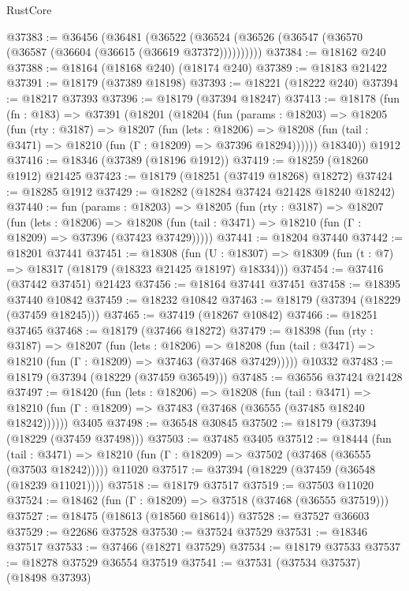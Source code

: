 \begin{lexlean}{RustCore}
\begin{coremodule}
@37383 := @36456
    (@36481 (@36522 (@36524 (@36526 (@36547 (@36570 (@36587 (@36604 (@36615 (@36619 @37372))))))))))
@37384 := @18162 @240
@37388 := @18164 (@18168 @240) (@18174 @240)
@37389 := @18183 @21422
@37391 := @18179 (@37389 @18198)
@37393 := @18221 (@18222 @240)
@37394 := @18217 @37393
@37396 := @18179 (@37394 @18247)
@37413 := @18178
    (fun (fn : @183) =>
    @37391
      (@18201
        (@18204
          (fun (params : @18203) =>
          @18205
            (fun (rty : @3187) =>
            @18207
              (fun (lets : @18206) =>
              @18208 (fun (tail : @3471) => @18210 (fun (Γ : @18209) => @37396 @18294))))))
        @18340))
    @1912
@37416 := @18346 (@37389 (@18196 @1912))
@37419 := @18259 (@18260 @1912) @21425
@37423 := @18179 (@18251 (@37419 @18268) @18272)
@37424 := @18285 @1912
@37429 := @18282 (@18284 @37424 @21428 @18240 @18242)
@37440 := fun (params : @18203) =>
  @18205
    (fun (rty : @3187) =>
    @18207
      (fun (lets : @18206) =>
      @18208 (fun (tail : @3471) => @18210 (fun (Γ : @18209) => @37396 (@37423 @37429)))))
@37441 := @18204 @37440
@37442 := @18201 @37441
@37451 := @18308
    (fun (U : @18307) => @18309 (fun (t : @7) => @18317 (@18179 (@18323 @21425 @18197) @18334)))
@37454 := @37416 (@37442 @37451) @21423
@37456 := @18164 @37441 @37451
@37458 := @18395 @37440 @10842
@37459 := @18232 @10842
@37463 := @18179 (@37394 (@18229 (@37459 @18245)))
@37465 := @37419 (@18267 @10842)
@37466 := @18251 @37465
@37468 := @18179 (@37466 @18272)
@37479 := @18398
    (fun (rty : @3187) =>
    @18207
      (fun (lets : @18206) =>
      @18208 (fun (tail : @3471) => @18210 (fun (Γ : @18209) => @37463 (@37468 @37429)))))
    @10332
@37483 := @18179 (@37394 (@18229 (@37459 @36549)))
@37485 := @36556 @37424 @21428
@37497 := @18420
    (fun (lets : @18206) =>
    @18208
      (fun (tail : @3471) =>
      @18210 (fun (Γ : @18209) => @37483 (@37468 (@36555 (@37485 @18240 @18242))))))
    @3405
@37498 := @36548 @30845
@37502 := @18179 (@37394 (@18229 (@37459 @37498)))
@37503 := @37485 @3405
@37512 := @18444
    (fun (tail : @3471) => @18210 (fun (Γ : @18209) => @37502 (@37468 (@36555 (@37503 @18242)))))
    @11020
@37517 := @37394 (@18229 (@37459 (@36548 (@18239 @11021))))
@37518 := @18179 @37517
@37519 := @37503 @11020
@37524 := @18462 (fun (Γ : @18209) => @37518 (@37468 (@36555 @37519)))
@37527 := @18475 (@18613 (@18560 @18614))
@37528 := @37527 @36603
@37529 := @22686 @37528
@37530 := @37524 @37529
@37531 := @18346 @37517
@37533 := @37466 (@18271 @37529)
@37534 := @18179 @37533
@37537 := @18278 @37529 @36554 @37519
@37541 := @37531 (@37534 @37537) (@18498 @37393)

\end{coremodule}
\end{lexlean}
